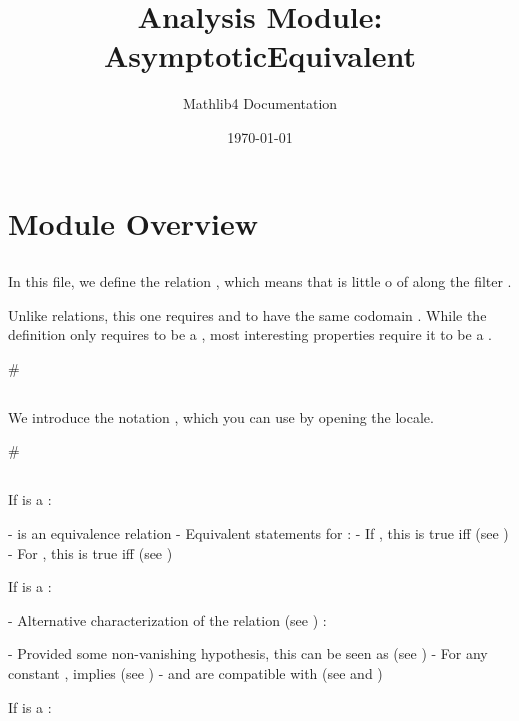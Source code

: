 \documentclass{article}
\title{Analysis Module: AsymptoticEquivalent}
\author{Mathlib4 Documentation}
\date{\today}
\theoremstyle{definition}
\begin{document}
\maketitle

\section{Module Overview}
\subsection{\1}

In this file, we define the relation \texttt{\1}, which means that \texttt{\1} is little o of
\texttt{\1} along the filter \texttt{\1}.

Unlike \texttt{\1} relations, this one requires \texttt{\1} and \texttt{\1} to have the same codomain \texttt{\1}.
While the definition only requires \texttt{\1} to be a \texttt{\1}, most interesting properties
require it to be a \texttt{\1}.

#\subsection{\1}

We introduce the notation \texttt{\1}, which you can use by opening the
\texttt{\1} locale.

#\subsection{\1}

If \texttt{\1} is a \texttt{\1} :

- \texttt{\1} is an equivalence relation
- Equivalent statements for \texttt{\1} :
  - If \texttt{\1}, this is true iff \texttt{\1} (see \texttt{\1})
  - For \texttt{\1}, this is true iff \texttt{\1} (see \texttt{\1})

If \texttt{\1} is a \texttt{\1} :

- Alternative characterization of the relation (see \texttt{\1}) :

  \texttt{\1}

- Provided some non-vanishing hypothesis, this can be seen as \texttt{\1}
  (see \texttt{\1})
- For any constant \texttt{\1}, \texttt{\1} implies \texttt{\1}
  (see \texttt{\1})
- \texttt{\1} and \texttt{\1} are compatible with \texttt{\1} (see \texttt{\1} and \texttt{\1})

If \texttt{\1} is a \texttt{\1} :
\end{document}
